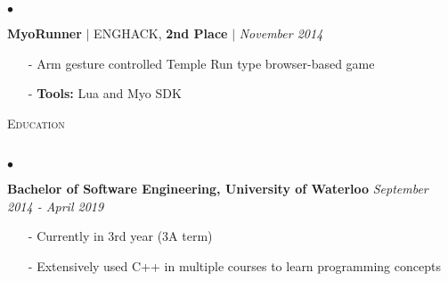 \documentclass[11pt]{article}
\newcommand{\lineunder}{\vspace*{-8pt} \\ \hspace*{-18pt} \hrulefill \\}
\newcommand{\header}[1]{{\hspace*{-15pt}\vspace*{6pt} \textsc{#1}} \vspace*{-6pt} \lineunder }
\newenvironment{achievements}{\begin{list}{$\bullet$}{\topsep 0pt \itemsep -1.5pt \leftmargin 5pt}}{\vspace*{4pt}\end{list}}
\begin{document}
\begin{achievements}
\vspace{6pt}

\item\textbf{MyoRunner} {$|$ \scriptsize ENGHACK, \textbf{2nd Place} }  $|$  \href{https://github.com/nakulpathak3/myorunner}{\faGithub} \hfill \textit {November 2014}
\begin{itemize}
\item[-]Arm gesture controlled Temple Run type browser-based game
\vspace{3pt}
\item[-]\textbf{Tools:} Lua and Myo SDK
\end{itemize}




\end{achievements}

\vspace{7pt}

\header{\fontsize{11.4}{10}\selectfont  Education}
\begin{achievements}
\item \textbf{Bachelor of Software Engineering, University of Waterloo} \hfill \textit {September 2014 - April 2019}
\begin{itemize}
\item[-] Currently in 3rd year (3A term)
\vspace{3pt}
\item[-] Extensively used C++ in multiple courses to learn programming concepts
\end{itemize}
\end{achievements}
\end{document}
